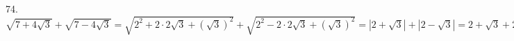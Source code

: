 74. $\sqrt{7+4\sqrt{3}}+\sqrt{7-4\sqrt{3}}=\sqrt{2^2+2\cdot2\sqrt{3}+(\sqrt{3})^2}+\sqrt{2^2-2\cdot2\sqrt{3}+(\sqrt{3})^2}=|2+\sqrt{3}|+|2-\sqrt{3}|=
2+\sqrt{3}+2-\sqrt{3}=4.$\\
